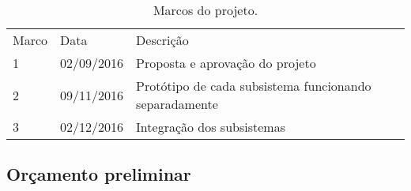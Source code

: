 \begin{table}[h]
 \centering
 {\renewcommand\arraystretch{1.25}
 \caption{Marcos do projeto.}
 \label{tab:marcos}
 \begin{tabular}{ l l l }
  \cline{1-1}\cline{2-2}\cline{3-3}  
    \multicolumn{1}{p{1.583cm}|}{Marco} &
    \multicolumn{1}{p{1.917cm}|}{Data} &
    \multicolumn{1}{p{8.950cm}}{Descrição}
  \\  
  \cline{1-1}\cline{2-2}\cline{3-3}  
    \multicolumn{1}{p{1.583cm}|}{1} &
    \multicolumn{1}{p{1.917cm}|}{02/09/2016} &
    \multicolumn{1}{p{8.950cm}}{Proposta e aprovação do projeto}
  \\  
  \cline{1-1}\cline{2-2}\cline{3-3}  
    \multicolumn{1}{p{1.583cm}|}{2} &
    \multicolumn{1}{p{1.917cm}|}{09/11/2016} &
    \multicolumn{1}{p{8.950cm}}{Protótipo de cada subsistema funcionando separadamente}
  \\  
  \cline{1-1}\cline{2-2}\cline{3-3}  
    \multicolumn{1}{p{1.583cm}|}{3} &
    \multicolumn{1}{p{1.917cm}|}{02/12/2016} &
    \multicolumn{1}{p{8.950cm}}{Integração dos subsistemas}
  \\  
  \hline

 \end{tabular} }
\end{table}

\subsection{Orçamento preliminar}


